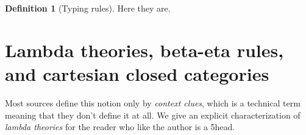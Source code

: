 \documentclass[12pt,twoside]{reedthesis}
\theoremstyle{definition}
\newtheorem{definition}{Definition}
\theoremstyle{remark}
\theoremstyle{plain}
\begin{document}
\begin{definition}[Typing rules]
  Here they are.

\end{definition}

\section{Lambda theories, beta-eta rules, and cartesian closed categories}
\newcommand{\evsig}[2]{\textrm{ev}_{#1,#2} : #2^{#1} \times #1 \rightarrow #2}
\newcommand{\ev}[2]{\textrm{ev}_{#1,#2}}

Most sources define this notion only by \emph{context clues}, which is a
technical term meaning that they don't define it at all. We give an explicit
characterization of \emph{lambda theories} for the reader who like the author is
a 5head.
\end{document}
